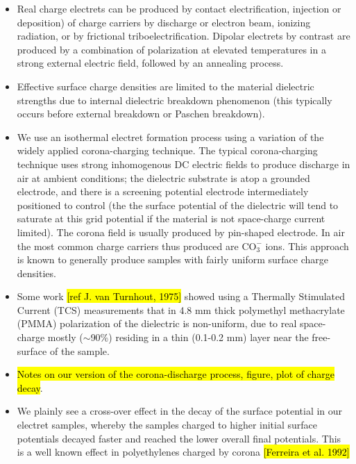 \documentclass[10pt,a4paper]{article}
\begin{document}
\begin{itemize}
\item Real charge electrets can be produced by contact electrification, injection or deposition) of charge carriers by discharge or electron beam, ionizing radiation, or by frictional triboelectrification. Dipolar electrets by contrast are produced by a combination of polarization at elevated temperatures in a strong external electric field, followed by an annealing process.
\item Effective surface charge densities are limited to the material dielectric strengths due to internal dielectric breakdown phenomenon (this typically occurs before external breakdown or Paschen breakdown).
\item We use an isothermal electret formation process using a variation of the widely applied corona-charging technique. The typical corona-charging technique uses strong inhomogenous DC electric fields to produce discharge in air at ambient conditions; the dielectric substrate is atop a grounded electrode, and there is a screening potential electrode intermediately positioned to control (the the surface potential of the dielectric will tend to saturate at this grid potential if the material is not space-charge current limited). The corona field is usually produced by pin-shaped electrode. In air the most common charge carriers thus produced are $\mbox{CO}_3^-$ ions. This approach is known to generally produce samples with fairly uniform surface charge densities.
\item Some work \hl{[ref J. van Turnhout, 1975]} showed using a Thermally Stimulated Current (TCS) measurements that in 4.8 mm thick polymethyl methacrylate (PMMA) polarization of the dielectric is non-uniform, due to real space-charge mostly ($\sim$90\%) residing in a thin (0.1-0.2 mm) layer near the free-surface of the sample.
\item \hl{Notes on our version of the corona-discharge process, figure, plot of charge decay}.
\item We plainly see a cross-over effect in the decay of the surface potential in our electret samples, whereby the samples charged to higher initial surface potentials decayed faster and reached the lower overall final potentials. This is a well known effect in polyethylenes charged by corona \hl{[Ferreira et al. 1992]}
\end{itemize}
\end{document}
